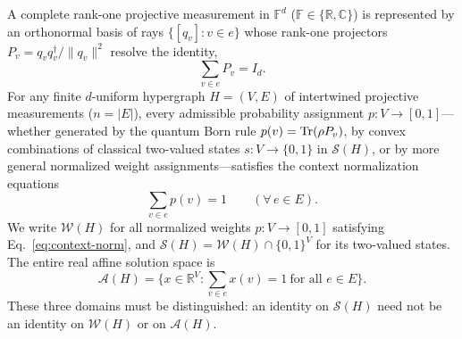 \documentclass[aps,pra,reprint,superscriptaddress,longbibliography,nofootinbib,floatfix,10pt]{revtex4-2}
\theoremstyle{definition}\newtheorem{definition}[theorem]{Definition}
\theoremstyle{remark}\newtheorem{remark}[theorem]{Remark}
\newcommand{\C}{\mathbb C}\newcommand{\R}{\mathbb R}\newcommand{\Q}{\mathbb Q}
\newcommand{\F}{\mathbb F}\newcommand{\Z}{\mathbb Z}\newcommand{\PP}{\mathbb P}
\newcommand{\Sc}{\mathcal S}\newcommand{\Cc}{\mathcal C}\newcommand{\Wc}{\mathcal W}
\begin{document}
A complete rank-one projective measurement in $\F^d$ ($\F\in\{\R,\C\}$) is represented by an orthonormal basis of rays $\{[q_v]:v\in e\}$ whose rank-one projectors $P_v=q_v q_v^\dagger/\|q_v\|^2$ resolve the identity,
\begin{equation}\label{eq:projector-completeness}
\sum_{v\in e} P_v = I_d.
\end{equation}
For any finite $d$-uniform hypergraph $H=(V,E)$ of intertwined projective measurements ($n=|E|$), every admissible probability assignment $p:V\to[0,1]$---whether generated by the quantum Born rule $p(v)=\operatorname{Tr}(\rho P_v)$, by convex combinations of classical two-valued states $s:V\to\{0,1\}$ in $\Sc(H)$, or by more general normalized weight assignments---satisfies the context normalization equations
\begin{equation}\label{eq:context-norm}
\sum_{v\in e} p(v) = 1 \qquad (\forall\, e\in E).
\end{equation}
We write $\Wc(H)$ for all normalized weights $p:V\to[0,1]$ satisfying Eq.~\eqref{eq:context-norm}, and $\Sc(H)=\Wc(H)\cap\{0,1\}^{V}$ for its two-valued states. The entire real affine solution space is
\begin{equation}\label{eq:affine-weight-space}
\mathcal A(H)=\bigl\{x\in\R^{V}:\sum_{v\in e}x(v)=1\ \text{for all }e\in E\bigr\}.
\end{equation}
These three domains must be distinguished: an identity on $\Sc(H)$ need not be an identity on $\Wc(H)$ or on $\mathcal A(H)$.
\end{document}
